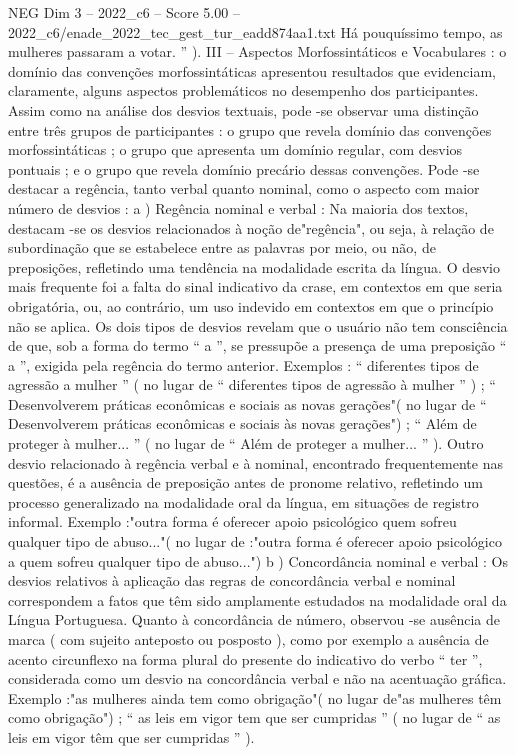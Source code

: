 \begin{textsample}{NEG Dim 3 – 2022\_c6 – Score 5.00 – 2022\_c6/enade\_2022\_tec\_gest\_tur\_eadd874aa1.txt}
Há pouquíssimo tempo, as mulheres passaram a votar. ” ).
III – Aspectos Morfossintáticos e Vocabulares : o domínio das convenções morfossintáticas apresentou resultados que evidenciam, claramente, alguns aspectos problemáticos no desempenho dos participantes.
Assim como na análise dos desvios textuais, pode -se observar uma distinção entre três grupos de participantes : o grupo que revela domínio das convenções morfossintáticas ; o grupo que apresenta um domínio regular, com desvios pontuais ; e o grupo que revela domínio precário dessas convenções.
Pode -se destacar a regência, tanto verbal quanto nominal, como o aspecto com maior número de desvios : a ) Regência nominal e verbal : Na maioria dos textos, destacam -se os desvios relacionados à noção de"regência", ou seja, à relação de subordinação que se estabelece entre as palavras por meio, ou não, de preposições, refletindo uma tendência na modalidade escrita da língua.
O desvio mais frequente foi a falta do sinal indicativo da crase, em contextos em que seria obrigatória, ou, ao contrário, um uso indevido em contextos em que o princípio não se aplica.
Os dois tipos de desvios revelam que o usuário não tem consciência de que, sob a forma do termo “ a ”, se pressupõe a presença de uma preposição “ a ”, exigida pela regência do termo anterior.
Exemplos : “ diferentes tipos de agressão a mulher ” ( no lugar de “ diferentes tipos de agressão à mulher ” ) ; “ Desenvolverem práticas econômicas e sociais as novas gerações"( no lugar de “ Desenvolverem práticas econômicas e sociais às novas gerações") ; “ Além de proteger à mulher... ” ( no lugar de “ Além de proteger a mulher... ” ).
Outro desvio relacionado à regência verbal e à nominal, encontrado frequentemente nas questões, é a ausência de preposição antes de pronome relativo, refletindo um processo generalizado na modalidade oral da língua, em situações de registro informal.
Exemplo :"outra forma é oferecer apoio psicológico quem sofreu qualquer tipo de abuso..."( no lugar de :"outra forma é oferecer apoio psicológico a quem sofreu qualquer tipo de abuso...") b ) Concordância nominal e verbal : Os desvios relativos à aplicação das regras de concordância verbal e nominal correspondem a fatos que têm sido amplamente estudados na modalidade oral da Língua Portuguesa.
Quanto à concordância de número, observou -se ausência de marca ( com sujeito anteposto ou posposto ), como por exemplo a ausência de acento circunflexo na forma plural do presente do indicativo do verbo “ ter ”, considerada como um desvio na concordância verbal e não na acentuação gráfica.
Exemplo :"as mulheres ainda tem como obrigação"( no lugar de"as mulheres têm como obrigação") ; “ as leis em vigor tem que ser cumpridas ” ( no lugar de “ as leis em vigor têm que ser cumpridas ” ).

\end{textsample}
